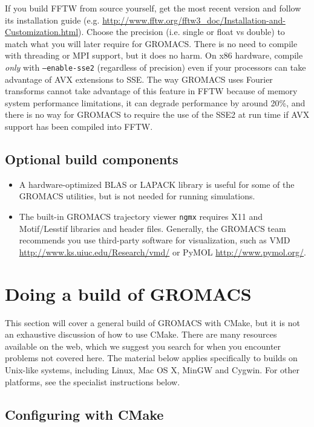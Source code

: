 \documentclass{article}[12pt,a4paper,twoside]
\newcommand{\gromacs}{GROMACS}
\newcommand{\fftw}{FFTW}
\newcommand{\mpi}{MPI}
\newcommand{\cmake}{CMake}
\newcommand{\sse}{SSE}
\newcommand{\ssetwo}{SSE2}
\newcommand{\avx}{AVX}
\newcommand{\blas}{BLAS}
\newcommand{\lapack}{LAPACK}
\newcommand{\vmd}{VMD}
\newcommand{\pymol}{PyMOL}
\begin{document}
If you build \fftw{} from source yourself, get the most recent version
and follow its installation guide
(e.g. \url{http://www.fftw.org/fftw3_doc/Installation-and-Customization.html}). Choose
the precision (i.e. single or float vs double) to match what you will
later require for \gromacs{}. There is no need to compile with
threading or \mpi{} support, but it does no harm. On x86 hardware,
compile \emph{only} with \texttt{--enable-sse2} (regardless of
precision) even if your processors can take advantage of \avx{}
extensions to \sse{}. The way \gromacs{} uses Fourier transforms
cannot take advantage of this feature in \fftw{} because of memory
system performance limitations, it can degrade performance by around
20\%, and there is no way for \gromacs{} to require the use of the
\ssetwo{} at run time if \avx{} support has been compiled into \fftw{}.

\subsection{Optional build components}

\begin{itemize}
\item A hardware-optimized \blas{} or \lapack{} library is useful for
  some of the \gromacs{} utilities, but is not needed for running
  simulations.
\item The built-in \gromacs{} trajectory viewer \texttt{ngmx} requires
  X11 and Motif/Lesstif libraries and header files. Generally, the
  \gromacs{} team recommends you use third-party software for
  visualization, such as \vmd{}
  \url{http://www.ks.uiuc.edu/Research/vmd/} or \pymol{}
  \url{http://www.pymol.org/}.
\end{itemize}

\section{Doing a build of \gromacs}

This section will cover a general build of \gromacs{} with \cmake{},
but it is not an exhaustive discussion of how to use \cmake{}. There
are many resources available on the web, which we suggest you search
for when you encounter problems not covered here. The material below
applies specifically to builds on Unix-like systems, including Linux,
Mac OS X, MinGW and Cygwin. For other platforms, see the specialist
instructions below.

\subsection{Configuring with \cmake{}}
\end{document}
